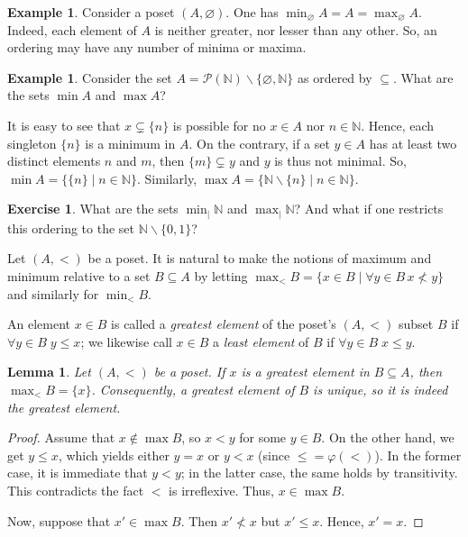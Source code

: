 \documentclass[12pt,notitlepage]{article}
\theoremstyle{plain}
\newtheorem{lemma}[thm]{Lemma}
\theoremstyle{definition}
\newtheorem{exc}[thm]{Exercise}
\newtheorem{exm}[thm]{Example}
\newtheorem{rem}[thm]{Remark}
\theoremstyle{plain}
\newcommand{\N}{\mathbb{N}}
\newcommand{\sbs}{\subseteq}
\renewcommand{\setminus}{\smallsetminus}
\newcommand{\void}{\varnothing}
\newcommand{\mP}{\mathcal{P}}
\renewcommand{\phi}{\varphi}
\newcommand{\id}{\mathrm{id}}
\newcommand{\1}{\mathbf{1}}
\newcommand{\0}{\mathbf{0}}
\newcommand{\dvd}{\mathop{\mid}}
\begin{document}
\begin{exm}
Consider a poset $(A, \void)$. One has $\min_{\void} A = A = \max_{\void} A$. Indeed, each element of $A$ is neither greater, nor lesser than any other. So, an ordering may have any number of minima or maxima.
\end{exm}

\begin{exm}
Consider the set $A = \mP(\N) \setminus \{\void, \N\}$ as ordered by ${\sbs}$. What are the sets $\min A$ and $\max A$?

It is easy to see that $x \subsetneq \{n\}$ is possible for no $x \in A$ nor $n \in \N$. Hence, each singleton $\{n\}$ is a minimum in $A$. On the contrary, if a set $y \in A$ has at least two distinct elements $n$ and $m$, then $\{m\} \subsetneq y$ and $y$ is thus not minimal. So, $\min A = \{ \{ n \} \mid n \in \N\}$. Similarly, $\max A = \{ \N \setminus \{ n \} \mid n \in \N\}$.
\end{exm} 

\begin{exc}
What are the sets $\min_{\dvd} \N$ and $\max_{\dvd} \N$? And what if one restricts this ordering to the set $\N \setminus \{0,1\}$?
\end{exc}

Let $(A, <)$ be a poset. It is natural to make the notions of maximum and minimum relative to a set $B \sbs A$ by letting $\max_{<} B = \{ x \in B \mid \forall y \in B\, x \nless y \}$ and similarly for $\min_{<} B$.
%

An element $x \in B$ is called a \emph{greatest element} of the poset's $(A, <)$ subset $B$ if $\forall y \in B\; y \leq x$; we likewise call $x \in B$ a \emph{least element} of $B$ if $\forall y \in B\; x \leq y$.

\begin{lemma}
Let $(A, <)$ be a poset. If $x$ is a greatest element in $B \sbs A$, then $\max_{<} B = \{x\}$. Consequently, a greatest element of $B$ is unique, so it is indeed \emph{the} greatest element.
\end{lemma}
\begin{proof}
Assume that $x \notin \max B$, so $x < y$ for some $y \in B$. On the other hand, we get $y \leq x$, which yields either $y = x$ or $y < x$ (since ${\leq} = \phi({<})$). In the former case, it is immediate that $y < y$; in the latter case, the same holds by transitivity. This contradicts the fact ${<}$ is irreflexive. Thus, $x \in \max B$.

Now, suppose that $x' \in \max B$. Then $x' \nless x$ but $x' \leq x$. Hence, $x' = x$.
\end{proof}
\end{document}
